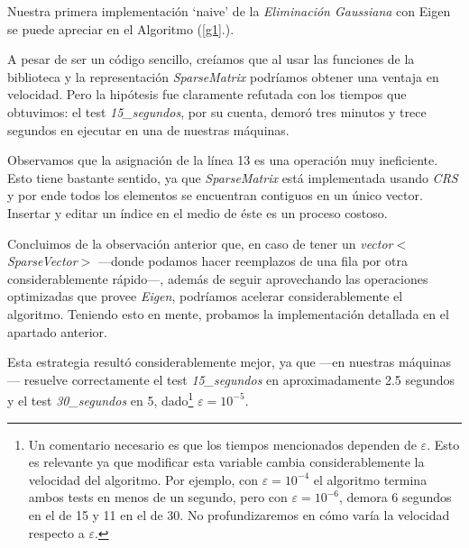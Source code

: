 \vspace{1em}
Nuestra primera implementación `naive' de la \textit{Eliminación Gaussiana} con Eigen se puede apreciar en el Algoritmo (\ref{g1}.).

\vspace{1em}
A pesar de ser un código sencillo, creíamos que al usar las funciones de la biblioteca y la representación \textit{SparseMatrix} podríamos obtener una ventaja en velocidad. Pero la hipótesis fue claramente refutada con los tiempos que obtuvimos: el test \textit{15\_segundos}, por su cuenta, demoró tres minutos y trece segundos en ejecutar en una de nuestras máquinas.

\vspace{1em}
Observamos que la asignación de la línea 13 es una operación muy ineficiente. Esto tiene bastante sentido, ya que \textit{SparseMatrix} está implementada usando \textit{CRS} y por ende todos los elementos se encuentran contiguos en un único vector. Insertar y editar un índice en el medio de éste es un proceso costoso.
 
\vspace{1em}
Concluimos de la observación anterior que, en caso de tener un \textit{vector$<$SparseVector$>$} ---donde podamos hacer reemplazos de una fila por otra considerablemente rápido---, además de seguir aprovechando las operaciones optimizadas que provee \textit{Eigen}, podríamos acelerar considerablemente el algoritmo. Teniendo esto en mente, probamos la implementación detallada en el apartado anterior.

\vspace{1em}


\vspace{1em}
Esta estrategia resultó considerablemente mejor, ya que ---en nuestras máquinas--- resuelve correctamente el test \textit{15\_segundos} en aproximadamente 2.5 segundos y el test \textit{30\_segundos} en 5, dado\footnote{Un comentario necesario es que los tiempos mencionados dependen de $\varepsilon$. Esto es relevante ya que modificar esta variable cambia considerablemente la velocidad del algoritmo. Por ejemplo, con $\varepsilon = 10^{-4}$ el algoritmo termina ambos tests en menos de un segundo, pero con $\varepsilon = 10^{-6}$, demora 6 segundos en el de 15 y 11 en el de 30. No profundizaremos en cómo varía la velocidad respecto a $\varepsilon$.
} $\varepsilon = 10^{-5}$.


